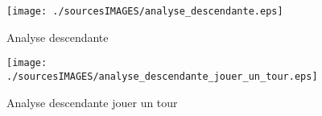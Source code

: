 \begin{figure}[h]
  \centering
  \texttt{[image: ./sourcesIMAGES/analyse\_descendante.eps]}
  \caption{Analyse descendante}
  \texttt{[image: ./sourcesIMAGES/analyse\_descendante\_jouer\_un\_tour.eps]}

  \caption{Analyse descendante jouer un tour}
\end{figure}
